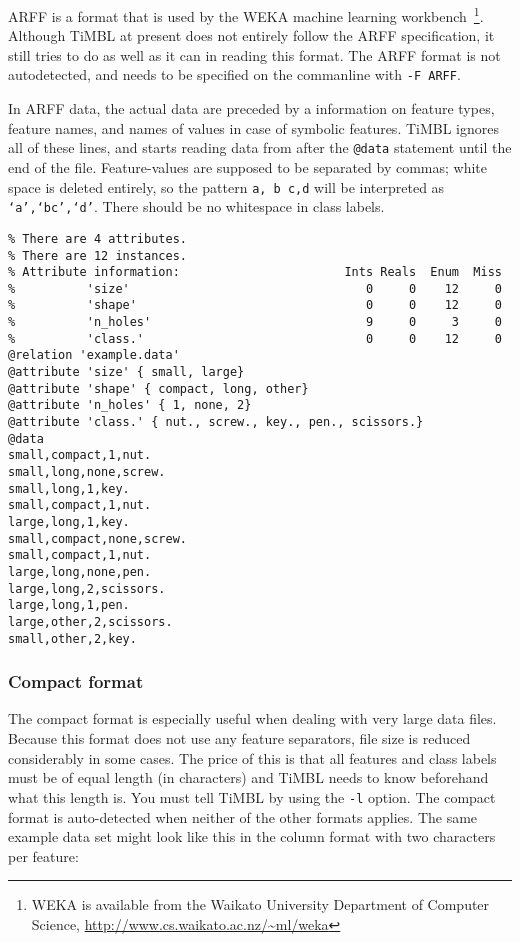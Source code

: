 \documentclass{book}
\begin{document}
ARFF is a format that is used by the WEKA machine learning
workbench~\cite{Garner95,Witten+99}\footnote{WEKA is available from
  the Waikato University Department of Computer Science,
  \url{http://www.cs.waikato.ac.nz/~ml/weka}}.  Although TiMBL at
present does not entirely follow the ARFF specification, it
still tries to do as well as it can in reading this format. The ARFF
format is not autodetected, and needs to be specified on the
commanline with {\tt -F ARFF}.

In ARFF data, the actual data are preceded by a information on feature
types, feature names, and names of values in case of symbolic
features. TiMBL ignores all of these lines, and starts reading data
from after the {\tt @data} statement until the end of the
file. Feature-values are supposed to be separated by commas; white
space is deleted entirely, so the pattern {\tt a, b c,d} will be
interpreted as {\tt `a',`bc',`d'}. There should be no whitespace in
class labels. 

\begin{footnotesize}
\begin{verbatim}
% There are 4 attributes.
% There are 12 instances.
% Attribute information:                       Ints Reals  Enum  Miss
%          'size'                                 0     0    12     0   
%          'shape'                                0     0    12     0   
%          'n_holes'                              9     0     3     0   
%          'class.'                               0     0    12     0   
@relation 'example.data'
@attribute 'size' { small, large}
@attribute 'shape' { compact, long, other}
@attribute 'n_holes' { 1, none, 2}
@attribute 'class.' { nut., screw., key., pen., scissors.}
@data
small,compact,1,nut.
small,long,none,screw.
small,long,1,key.
small,compact,1,nut.
large,long,1,key.
small,compact,none,screw.
small,compact,1,nut.
large,long,none,pen.
large,long,2,scissors.
large,long,1,pen.
large,other,2,scissors.
small,other,2,key.
\end{verbatim}
\end{footnotesize}

\subsubsection{Compact format}
\label{compactformat}

The compact format is especially useful when dealing with very large
data files. Because this format does not use any feature separators,
file size is reduced considerably in some cases. The price of this is
that all features and class labels must be of equal length (in
characters) and TiMBL needs to know beforehand what this length
is. You must tell TiMBL by using the {\tt -l} option. The compact
format is auto-detected when neither of the other formats applies. The
same example data set might look like this in the column format with
two characters per feature:
\end{document}

